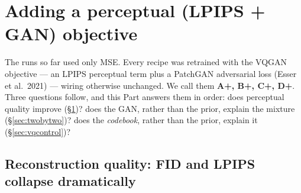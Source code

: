 \documentclass[11pt]{article}
\begin{document}
\section{Adding a perceptual (LPIPS + GAN) objective}
\label{sec:gan}
The runs so far used only MSE. Every recipe was retrained with the VQGAN objective --- an
LPIPS perceptual term plus a PatchGAN adversarial loss (Esser et al.\ 2021) --- wiring otherwise
unchanged. We call them \textbf{A+, B+, C+, D+}. Three questions follow, and this Part answers
them in order: does perceptual quality improve (\S\ref{sec:gan})? does the GAN, rather than the
prior, explain the mixture (\S\ref{sec:twobytwo})? does the \emph{codebook}, rather than the
prior, explain it (\S\ref{sec:vqcontrol})?

\subsection*{Reconstruction quality: FID and LPIPS collapse dramatically}
\end{document}
